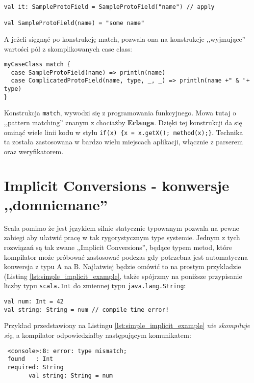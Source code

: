 \begin{lstlisting}
val it: SampleProtoField = SampleProtoField("name") // apply

val SampleProtoField(name) = "some name"
\end{lstlisting}

A jeżeli sięgnąć po konstrukcję match, pozwala ona na konstrukcje ,,wyjmujące'' wartości pól z skomplikowanych case class:

\begin{lstlisting}
myCaseClass match {
  case SampleProtoField(name) => println(name)
  case ComplicatedProtoField(name, type, _, _) => println(name +" & "+ type)
}
\end{lstlisting}

Konstrukcja \verb|match|, wywodzi się z programowania funkcyjnego. Mowa tutaj o ,,pattern matching''
znanym z chociażby \textbf{Erlanga}. Dzięki tej konstrukcji da się ominąć wiele linii kodu w stylu \verb|if(x) {x = x.getX(); method(x);}|.
Technika ta została zastosowana w bardzo wielu miejscach aplikacji, włącznie z parserem oraz weryfikatorem.


\section{Implicit Conversions - konwersje ,,domniemane''}
\label{sec:implicit}
Scala pomimo że jest językiem silnie statycznie typowanym pozwala na pewne zabiegi aby ułatwić pracę w tak rygorystycznym type systemie.
Jednym z tych rozwiązań są tak zwane ,,Implicit Conversions'', będące typem metod, które kompilator może próbować zastosować podczas gdy 
potrzebna jest automatyczna konwersja z typu A na B. Najłatwiej będzie omówić to na prostym przykładzie (Listing \ref{lst:simple_implicit_example},
także spójrzmy na poniższe przypisanie liczby typu \verb|scala.Int| do zmiennej typu \verb|java.lang.String|:

\begin{lstlisting}[caption={Przykład wystąpienia implicit conversion}, label={lst:simple_implicit_example}]
val num: Int = 42
val string: String = num // compile time error!
\end{lstlisting}

Przykład przedstawiony na Listingu \ref{lst:simple_implicit_example} \textit{nie skompiluje się}, a kompilator odpowiedziałby następującym komunikatem:

\begin{verbatim}
 <console>:8: error: type mismatch;
 found   : Int
 required: String
       val string: String = num
\end{verbatim}

